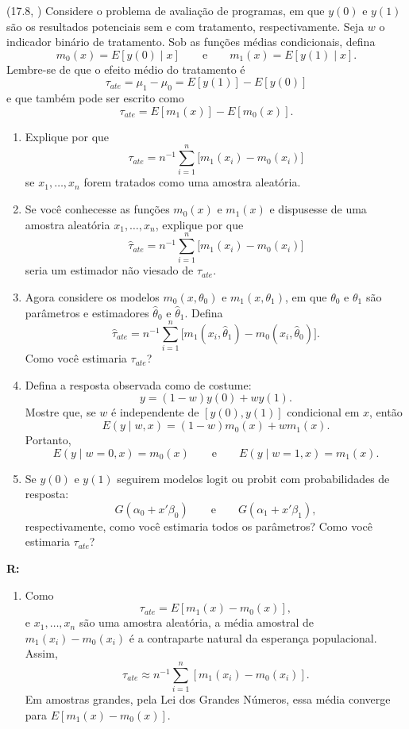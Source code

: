 \documentclass[12pt,letterpaper,onecolumn]{exam}
\renewenvironment{solution}
{\par\noindent\textbf{R:}\enspace\color{blue}}
{\par\color{black}}
\begin{document}
\begin{questions}
\question\qstar (17.8, \citep{wooldridge2016}) Considere o problema de avaliação de programas, em que \(y(0)\) e \(y(1)\) são os resultados potenciais sem e com tratamento, respectivamente. Seja \(w\) o indicador binário de tratamento. Sob as funções médias condicionais, defina
\[
m_0(x)=E[y(0)\mid x]
\qquad \text{e} \qquad
m_1(x)=E[y(1)\mid x].
\]
Lembre-se de que o efeito médio do tratamento é
\[
\tau_{ate}=\mu_1-\mu_0=E[y(1)]-E[y(0)]
\]
e que também pode ser escrito como
\[
\tau_{ate}=E[m_1(x)]-E[m_0(x)].
\]
\begin{enumerate}[label=(\roman*)]
    \item Explique por que
    \[
    \tau_{ate}=n^{-1}\sum_{i=1}^{n}\big[m_1(x_i)-m_0(x_i)\big]
    \]
    se \(x_1,\ldots,x_n\) forem tratados como uma amostra aleatória.
    \item Se você conhecesse as funções \(m_0(x)\) e \(m_1(x)\) e dispusesse de uma amostra aleatória \(x_1,\ldots,x_n\), explique por que
    \[
    \hat{\tau}_{ate}=n^{-1}\sum_{i=1}^{n}\big[m_1(x_i)-m_0(x_i)\big]
    \]
    seria um estimador não viesado de \(\tau_{ate}\).
    \item Agora considere os modelos \(m_0(x,\theta_0)\) e \(m_1(x,\theta_1)\), em que \(\theta_0\) e \(\theta_1\) são parâmetros e estimadores \(\hat{\theta}_0\) e \(\hat{\theta}_1\). Defina
    \[
    \hat{\tau}_{ate}=n^{-1}\sum_{i=1}^{n}\big[m_1(x_i,\hat{\theta}_1)-m_0(x_i,\hat{\theta}_0)\big].
    \]
    Como você estimaria \(\tau_{ate}\)?
    \item Defina a resposta observada como de costume:
    \[
    y=(1-w)y(0)+wy(1).
    \]
    Mostre que, se \(w\) é independente de \([y(0),y(1)]\) condicional em \(x\), então
    \[
    E(y\mid w,x)=(1-w)m_0(x)+wm_1(x).
    \]
    Portanto,
    \[
    E(y\mid w=0,x)=m_0(x)
    \qquad \text{e} \qquad
    E(y\mid w=1,x)=m_1(x).
    \]
    \item Se \(y(0)\) e \(y(1)\) seguirem modelos logit ou probit com probabilidades de resposta:
    \[
    G(\alpha_0+x'\beta_0)
    \qquad \text{e} \qquad
    G(\alpha_1+x'\beta_1),
    \]
    respectivamente, como você estimaria todos os parâmetros? Como você estimaria \(\tau_{ate}\)?
\end{enumerate}

\begin{solution}
\begin{enumerate}[label=(\roman*)]
    \item Como
    \[
    \tau_{ate}=E[m_1(x)-m_0(x)],
    \]
    e \(x_1,\ldots,x_n\) são uma amostra aleatória, a média amostral de \(m_1(x_i)-m_0(x_i)\) é a contraparte natural da esperança populacional. Assim,
    \[
    \tau_{ate}\approx n^{-1}\sum_{i=1}^{n}[m_1(x_i)-m_0(x_i)].
    \]
    Em amostras grandes, pela Lei dos Grandes Números, essa média converge para \(E[m_1(x)-m_0(x)]\).


\end{enumerate}
\end{solution}
\end{questions}
\end{document}
